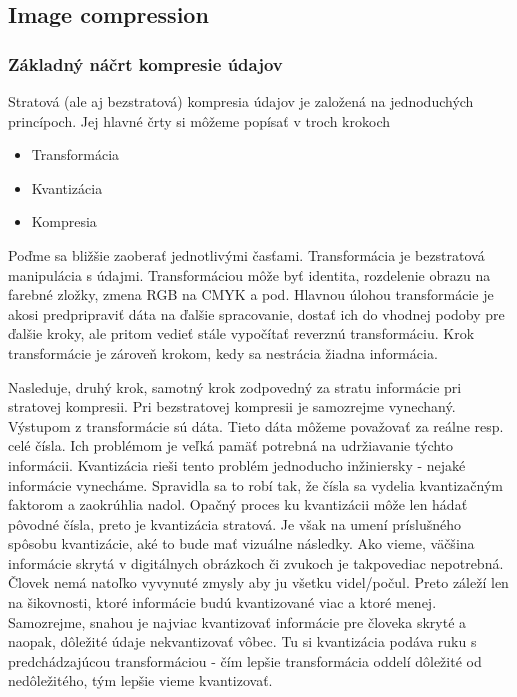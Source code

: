 \subsection{Image compression}

\subsubsection{Základný náčrt kompresie údajov}
Stratová (ale aj bezstratová) kompresia údajov je založená na
jednoduchých princípoch. Jej hlavné črty si môžeme popísať v troch
krokoch
\begin{itemize}
\item Transformácia
\item Kvantizácia
\item Kompresia
\end{itemize}
Poďme sa bližšie zaoberať jednotlivými časťami.
Transformácia je bezstratová manipulácia s údajmi. Transformáciou môže
byť identita, rozdelenie obrazu na farebné zložky, zmena RGB na CMYK a
pod. Hlavnou úlohou transformácie je akosi predpripraviť dáta na
ďalšie spracovanie, dostať ich do vhodnej podoby pre ďalšie kroky, ale
pritom vedieť stále vypočítať reverznú transformáciu. Krok
transformácie je zároveň krokom, kedy sa nestrácia žiadna informácia.

Nasleduje, druhý krok, samotný krok zodpovedný za stratu informácie
pri stratovej kompresii. Pri bezstratovej kompresii je samozrejme
vynechaný. Výstupom z transformácie sú dáta. Tieto dáta môžeme
považovať za reálne resp. celé čísla. Ich problémom je veľká pamäť
potrebná na udržiavanie týchto informácii. Kvantizácia rieši tento
problém jednoducho inžiniersky - nejaké informácie vynecháme.
Spravidla sa to robí tak, že čísla sa vydelia kvantizačným faktorom a
zaokrúhlia nadol. Opačný proces ku kvantizácii môže len hádať pôvodné
čísla, preto je kvantizácia stratová. Je však na umení príslušného
spôsobu kvantizácie, aké to bude mať vizuálne následky. Ako vieme,
väčšina informácie skrytá v digitálnych obrázkoch či zvukoch je
takpovediac nepotrebná. Človek nemá natoľko vyvynuté zmysly aby ju
všetku videl/počul. Preto záleží len na šikovnosti, ktoré informácie
budú kvantizované viac a ktoré menej. Samozrejme, snahou je najviac
kvantizovať informácie pre človeka skryté a naopak, dôležité údaje
nekvantizovať vôbec. Tu si kvantizácia podáva ruku s predchádzajúcou
transformáciou - čím lepšie transformácia oddelí dôležité od
nedôležitého, tým lepšie vieme kvantizovať.

